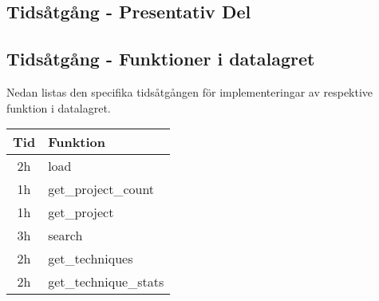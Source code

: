 \documentclass{TDP003mall}
\begin{document}
\subsection{Tidsåtgång - Presentativ Del}


\subsection{Tidsåtgång - Funktioner i datalagret}
Nedan listas den specifika tidsåtgången för implementeringar av respektive funktion i datalagret.

\begin{tabular}{|c|l|}
  \hline
  Tid & Funktion\\
  \hline
  2h & load\\
  \hline
  1h & get\_project\_count\\
  \hline
  1h & get\_project\\
  \hline
  3h & search\\
  \hline
  2h & get\_techniques\\
  \hline
  2h & get\_technique\_stats\\
  \hline
\end{tabular}
\end{document}
